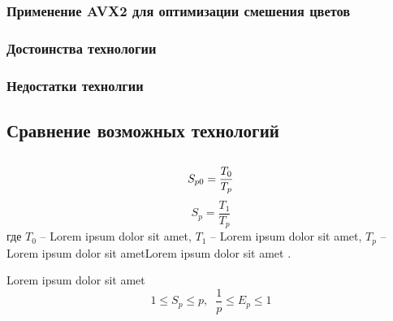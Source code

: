 \subsubsection{Применение AVX2 для оптимизации смешения цветов}
\subsubsection{Достоинства технологии}
\subsubsection{Недостатки технолгии}
\subsection{Сравнение возможных технологий}
\subsection{}



\begin{equation}
S_{p0}=\frac{T_{0} }{T_{p}} \\
\label{F:100}
\end{equation}
\begin{equation}
S_{p}=\frac{T_{1} }{T_{p}}
\label{F:101}
\end{equation}
где $T_{0}$ -- Lorem ipsum dolor sit amet, $T_{1}$ -- Lorem ipsum dolor sit amet, $T_{p}$ -- Lorem ipsum dolor sit ametLorem ipsum dolor sit amet . 

Lorem ipsum dolor sit amet
\begin{equation}
1\leq S_{p} \leq p,\; \;  \frac{1}{p} \leq E_{p} \leq 1
\label{F:103}
\end{equation}





